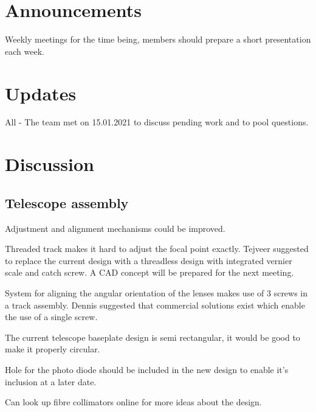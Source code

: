 \documentclass{meetingmins}
\begin{document}
\maketitle

\section{Announcements}
    \begin{items}
        \item Weekly meetings for the time being, members should prepare a short presentation each week.
    \end{items}

\section{Updates}
    \begin{items}
        \item All - The team met on 15.01.2021 to discuss pending work and to pool questions. 
    \end{items}

\section{Discussion}
    \subsection{Telescope assembly}
    \begin{subitems}
        \item Adjustment and alignment mechanisms could be improved.
        \item Threaded track makes it hard to adjust the focal point exactly. Tejveer suggested to replace the current design with a threadless design with integrated vernier scale and catch screw. A CAD concept will be prepared for the next meeting.
        \item System for aligning the angular orientation of the lenses makes use of 3 screws in a track assembly. Dennis suggested that commercial solutions exist which enable the use of a single screw.
        \item The current telescope baseplate design is semi rectangular, it would be good to make it properly circular.
        \item Hole for the photo diode should be included in the new design to enable it's inclusion at a later date.
        \item Can look up fibre collimators online for more ideas about the design.   
    \end{subitems}
\end{document}
